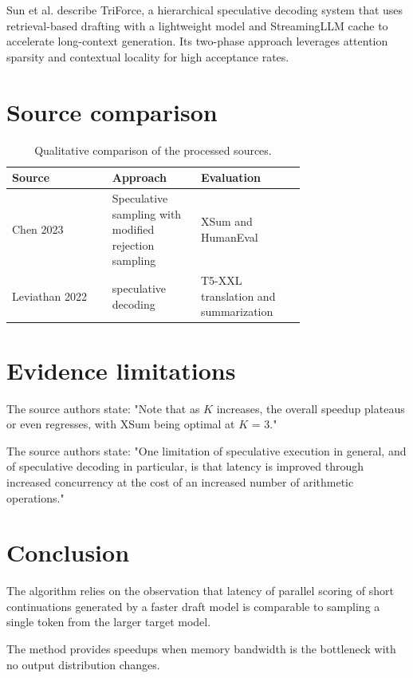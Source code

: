 \documentclass[conference]{IEEEtran}
\begin{document}
Sun et al. describe TriForce, a hierarchical speculative decoding system that uses retrieval-based drafting with a lightweight model and StreamingLLM cache to accelerate long-context generation. Its two-phase approach leverages attention sparsity and contextual locality for high acceptance rates. \cite{sun2024triforce}

\section{Source comparison}
\begin{table}[H]\centering
\caption{Qualitative comparison of the processed sources.}
\begin{tabular}{|>{\raggedright\arraybackslash}p{0.26\linewidth}|>{\raggedright\arraybackslash}p{0.235\linewidth}|>{\raggedright\arraybackslash}p{0.235\linewidth}|}\hline
Source & Approach & Evaluation \\ \hline
Chen 2023 \cite{chen2023accelerating} & Speculative sampling with modified rejection sampling & XSum and HumanEval \\ \hline
Leviathan 2022 \cite{leviathan2022fast} & speculative decoding & T5-XXL translation and summarization \\ \hline
\end{tabular}\end{table}
\section{Evidence limitations}
The source authors state: "Note that as \ensuremath{\mathit{K}}
increases, the overall speedup plateaus or even regresses, with XSum being optimal at \ensuremath{\mathit{K}} = 3." \cite{chen2023accelerating}

The source authors state: "One limitation of speculative execution in general, and of
speculative decoding in particular, is that latency is improved through increased concurrency at the cost of an increased number of arithmetic operations." \cite{leviathan2022fast}

\section{Conclusion}
The algorithm relies on the observation that latency of parallel scoring of short continuations generated by a faster draft model is comparable to sampling a single token from the larger target model. \cite{chen2023accelerating}

The method provides speedups when memory bandwidth is the bottleneck with no output distribution changes. \cite{leviathan2022fast}



\end{document}
